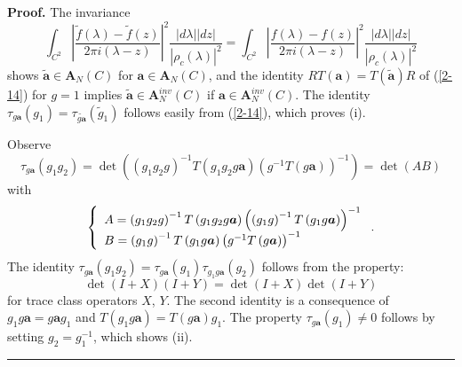 \documentclass[a4paper]{article}%
\newenvironment{proof}[1][Proof]{\noindent\textbf{#1.} }{\ \rule{0.5em}{0.5em}}
\begin{document}
\begin{proof}
The invariance
\[%
{\displaystyle\int_{C^{2}}}
\left\vert \dfrac{\widetilde{f}\left(  \lambda\right)  -\widetilde{f}\left(
z\right)  }{2\pi i\left(  \lambda-z\right)  }\right\vert ^{2}\dfrac{\left\vert
d\lambda\right\vert \left\vert dz\right\vert }{\left\vert \rho_{c}\left(
\lambda\right)  \right\vert ^{2}}=%
{\displaystyle\int_{C^{2}}}
\left\vert \dfrac{f\left(  \lambda\right)  -f\left(  z\right)  }{2\pi i\left(
\lambda-z\right)  }\right\vert ^{2}\dfrac{\left\vert d\lambda\right\vert
\left\vert dz\right\vert }{\left\vert \rho_{c}\left(  \lambda\right)
\right\vert ^{2}}%
\]
shows $\widetilde{\boldsymbol{a}}\in\boldsymbol{A}_{N}\left(  C\right)  $ for
$\boldsymbol{a}\in\boldsymbol{A}_{N}\left(  C\right)  $, and the identity
$RT\left(  \boldsymbol{a}\right)  =T\left(  \widetilde{\boldsymbol{a}}\right)
R$ of (\ref{2-14}) for $g=1$ implies $\widetilde{\boldsymbol{a}}%
\in\boldsymbol{A}_{N}^{inv}\left(  C\right)  $ if $\boldsymbol{a}%
\in\boldsymbol{A}_{N}^{inv}\left(  C\right)  $. The identity $\tau
_{g\boldsymbol{a}}\left(  g_{1}\right)  =\tau_{\widetilde{g\boldsymbol{a}}%
}\left(  \widetilde{g}_{1}\right)  $ follows easily from (\ref{2-14}), which
proves (i).

Observe%
\[
\tau_{g\boldsymbol{a}}\left(  g_{1}g_{2}\right)  =\det\left(  \left(
g_{1}g_{2}g\right)  ^{-1}T\left(  g_{1}g_{2}g\boldsymbol{a}\right)  \left(
g^{-1}T\left(  g\boldsymbol{a}\right)  \right)  ^{-1}\right)  =\det\left(
AB\right)
\]
with%
\[
\left\{
\begin{array}
[c]{l}%
A=\left(  g_{1}g_{2}g\right)  ^{-1}T\left(  g_{1}g_{2}g\boldsymbol{a}\right)
\left(  \left(  g_{1}g\right)  ^{-1}T\left(  g_{1}g\boldsymbol{a}\right)
\right)  ^{-1}\\
B=\left(  g_{1}g\right)  ^{-1}T\left(  g_{1}g\boldsymbol{a}\right)  \left(
g^{-1}T\left(  g\boldsymbol{a}\right)  \right)  ^{-1}%
\end{array}
\right.  \text{.}%
\]
The identity $\tau_{g\boldsymbol{a}}\left(  g_{1}g_{2}\right)  =\tau
_{g\boldsymbol{a}}\left(  g_{1}\right)  \tau_{g_{1}g\boldsymbol{a}}\left(
g_{2}\right)  $ follows from the property:%
\[
\det\left(  I+X\right)  \left(  I+Y\right)  =\det\left(  I+X\right)
\det\left(  I+Y\right)
\]
for trace class operators $X$, $Y$. The second identity is a consequence of
$g_{1}g\boldsymbol{a}=g\boldsymbol{a}g_{1}$ and $T\left(  g_{1}g\boldsymbol{a}%
\right)  =T\left(  g\boldsymbol{a}\right)  g_{1}$. The property $\tau
_{g\boldsymbol{a}}\left(  g_{1}\right)  \neq0$ follows by setting $g_{2}%
=g_{1}^{-1}$, which shows (ii).\bigskip\ 
\end{proof}
\end{document}
